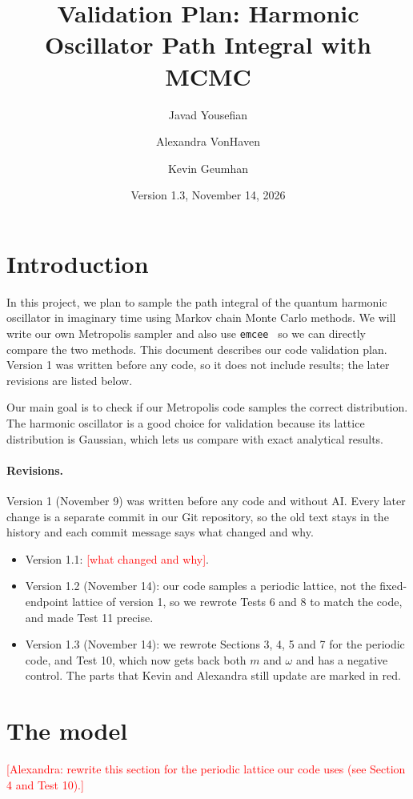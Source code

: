 \documentclass[11pt]{article}
\title{Validation Plan: Harmonic Oscillator Path Integral with MCMC}
\author{Javad Yousefian \and Alexandra VonHaven \and Kevin Geumhan}
\date{Version 1.3, November 14, 2026}
\newcommand{\fillin}[1]{\textcolor{red}{[#1]}}
\begin{document}
\maketitle

\section{Introduction}
In this project, we plan to sample the path integral of the quantum harmonic oscillator in imaginary time using Markov chain Monte Carlo methods. We will write our own Metropolis sampler and also use \texttt{emcee}~\cite{emcee} so we can directly compare the two methods. This document describes our code validation plan. Version 1 was written before any code, so it does not include results; the later revisions are listed below.

Our main goal is to check if our Metropolis code samples the correct distribution. The harmonic oscillator is a good choice for validation because its lattice distribution is Gaussian, which lets us compare with exact analytical results.

\paragraph{Revisions.} Version 1 (November 9) was written before any code and without AI. Every later change is a separate commit in our Git repository, so the old text stays in the history and each commit message says what changed and why.
\begin{itemize}
  \item Version 1.1: \fillin{what changed and why}.
  \item Version 1.2 (November 14): our code samples a periodic lattice, not the fixed-endpoint lattice of version 1, so we rewrote Tests 6 and 8 to match the code, and made Test 11 precise.
  \item Version 1.3 (November 14): we rewrote Sections 3, 4, 5 and 7 for the periodic code, and Test 10, which now gets back both $m$ and $\omega$ and has a negative control. The parts that Kevin and Alexandra still update are marked in red.
\end{itemize}

\section{The model}
\fillin{Alexandra: rewrite this section for the periodic lattice our code uses (see Section 4 and Test 10).}
\end{document}
